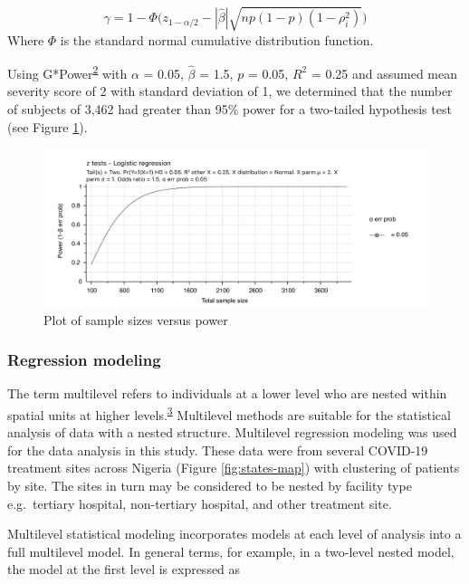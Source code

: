\documentclass[
  10pt,
]{article}
\begin{document}
\[\gamma = 1 - \Phi\Big(z_{1-\alpha/2} - |\hat{\beta}|\sqrt{np(1-p)(1-\rho^2_i)}\Big)\]
Where \(\Phi\) is the standard normal cumulative distribution function.

Using G*Power\textsuperscript{\protect\hyperlink{ref-faul2009}{2}} with
\(\alpha\) = 0.05, \(\hat{\beta}\) = 1.5, \(p\) = 0.05, \(R^2\) = 0.25
and assumed mean severity score of 2 with standard deviation of 1, we
determined that the number of subjects of 3,462 had greater than 95\%
power for a two-tailed hypothesis test (see Figure
\ref{fig:power-analysis}).

\begin{figure}[h]

{\centering \includegraphics{power_plot} 

}

\caption{Plot of sample sizes versus power}\label{fig:power-analysis}
\end{figure}

\clearpage

\hypertarget{regression-modeling}{%
\subsubsection{Regression modeling}\label{regression-modeling}}

The term multilevel refers to individuals at a lower level who are
nested within spatial units at higher
levels.\textsuperscript{\protect\hyperlink{ref-subramanian2004}{3}}
Multilevel methods are suitable for the statistical analysis of data
with a nested structure. Multilevel regression modeling was used for the
data analysis in this study. These data were from several COVID-19
treatment sites across Nigeria (Figure \ref{fig:states-map}) with
clustering of patients by site. The sites in turn may be considered to
be nested by facility type e.g.~tertiary hospital, non-tertiary
hospital, and other treatment site.

Multilevel statistical modeling incorporates models at each level of
analysis into a full multilevel model. In general terms, for example, in
a two-level nested model, the model at the first level is expressed as
\end{document}
